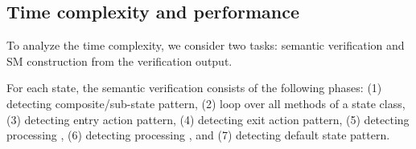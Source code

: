 \subsection{Time complexity and performance}
To analyze the time complexity, we consider two tasks: semantic verification and SM construction from the verification output. 

For each state, the semantic verification consists of the following phases: (1) detecting composite/sub-state pattern, (2) loop over all methods of a state class, (3) detecting entry action pattern, (4) detecting exit action pattern, (5) detecting processing , (6) detecting processing , and (7) detecting default state pattern. 

